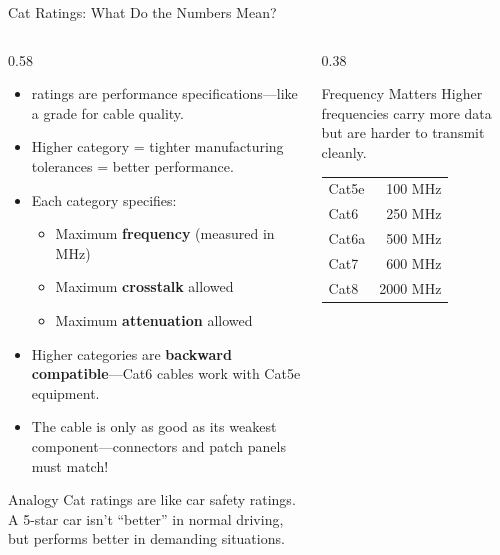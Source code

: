 \documentclass[aspectratio=169]{beamer}  %
\begin{document}
\begin{frame}[t,shrink=10]{Cat Ratings: What Do the Numbers Mean?}
    \begin{columns}[T]
        \begin{column}{0.58\textwidth}
            \begin{itemize}
                \item {} ratings are performance specifications---like a grade for cable quality.
                \item Higher category = tighter manufacturing tolerances = better performance.
                \item Each category specifies:
                    \begin{itemize}
                        \item Maximum \textbf{frequency} (measured in MHz)
                        \item Maximum \textbf{crosstalk} allowed
                        \item Maximum \textbf{attenuation} allowed
                    \end{itemize}
                \item Higher categories are \textbf{backward compatible}---Cat6 cables work with Cat5e equipment.
                \item The cable is only as good as its weakest component---connectors and patch panels must match!
            \end{itemize}
            
            \vspace{0.3em}
            \begin{exampleblock}{Analogy}
                Cat ratings are like car safety ratings. A 5-star car isn't ``better'' in normal driving, but performs better in demanding situations.
            \end{exampleblock}
        \end{column}
        \begin{column}{0.38\textwidth}
            \begin{block}{Frequency Matters}
                Higher frequencies carry more data but are harder to transmit cleanly.
                
                \vspace{0.3em}
                \centering
                \begin{tabular}{l r}
                    Cat5e & 100 MHz \\
                    Cat6 & 250 MHz \\
                    Cat6a & 500 MHz \\
                    Cat7 & 600 MHz \\
                    Cat8 & 2000 MHz \\
                \end{tabular}
            \end{block}
            

\end{column}
\end{columns}
\end{frame}
\end{document}
